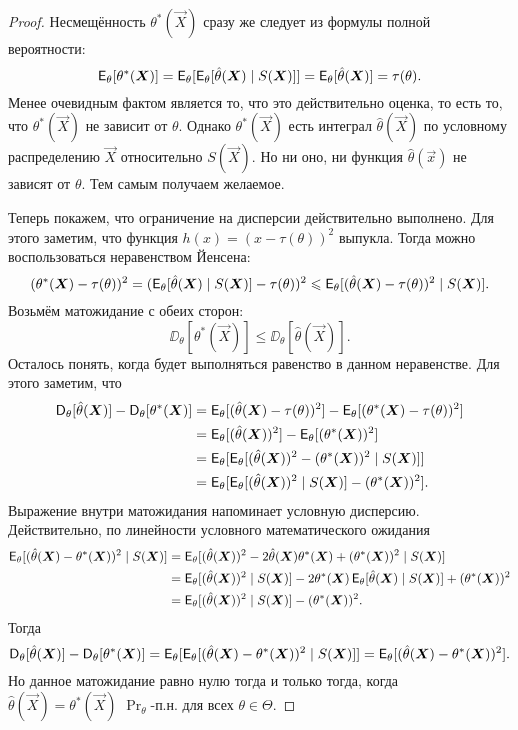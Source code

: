 \begin{proof}
	Несмещённость $\theta^{*}(\vec{X})$ сразу же следует из формулы полной вероятности:
	\[
		\operatorname{\mathsf{E}}_{\theta}[\theta^{*}(\bm{X})]
		= \operatorname{\mathsf{E}}_{\theta}[\operatorname{\mathsf{E}}_{\theta}[\hat{\theta}(\bm{X}) \mid S(\bm{X})]]
		= \operatorname{\mathsf{E}}_{\theta}[\hat{\theta}(\bm{X})]
		= \tau(\theta).
	\]
	Менее очевидным фактом является то, что это действительно оценка, то есть то, что $\theta^{*}(\vec{X})$ не зависит от $\theta$. Однако $\theta^{*}(\vec{X})$ есть интеграл $\hat{\theta}(\vec{X})$ по условному распределению $\vec{X}$ относительно $S(\vec{X})$. Но ни оно, ни функция $\hat{\theta}(\vec{x})$ не зависят от $\theta$. Тем самым получаем желаемое.

	Теперь покажем, что ограничение на дисперсии действительно выполнено. Для этого заметим, что функция $h(x) = (x - \tau(\theta))^{2}$ выпукла. Тогда можно воспользоваться неравенством Йенсена:
	\[
		(\theta^{*}(\bm{X}) - \tau(\theta))^{2} 
		= (\operatorname{\mathsf{E}}_{\theta}[\hat{\theta}(\bm{X}) \mid S(\bm{X})] - \tau(\theta))^{2}
		\leqslant \operatorname{\mathsf{E}}_{\theta}[(\hat{\theta}(\bm{X}) - \tau(\theta))^{2} \mid S(\bm{X})]. 
	\]
	Возьмём матожидание с обеих сторон:
	\[
		\DD_{\theta}[\theta^{*}(\vec{X})] \leq \DD_{\theta}[\hat{\theta}(\vec{X})].
	\]
	Осталось понять, когда будет выполняться равенство в данном неравенстве. Для этого заметим, что
	\begin{align*}
		\operatorname{\mathsf{D}}_{\theta}[\hat{\theta}(\bm{X})] - \operatorname{\mathsf{D}}_{\theta}[\theta^{*}(\bm{X})]
		&= \operatorname{\mathsf{E}}_{\theta}[(\hat{\theta}(\bm{X}) - \tau(\theta))^{2}] - \operatorname{\mathsf{E}}_{\theta}[(\theta^{*}(\bm{X}) - \tau(\theta))^{2}] \\
		&= \operatorname{\mathsf{E}}_{\theta}[(\hat{\theta}(\bm{X}))^{2}] - \operatorname{\mathsf{E}}_{\theta}[(\theta^{*}(\bm{X}))^{2}] \\
		&= \operatorname{\mathsf{E}}_{\theta}[\operatorname{\mathsf{E}}_{\theta}[(\hat{\theta}(\bm{X}))^{2} - (\theta^{*}(\bm{X}))^{2} \mid S(\bm{X})]] \\
		&= \operatorname{\mathsf{E}}_{\theta}[\operatorname{\mathsf{E}}_{\theta}[(\hat{\theta}(\bm{X}))^{2} \mid S(\bm{X})] - (\theta^{*}(\bm{X}))^{2}].
	\end{align*}
	Выражение внутри матожидания напоминает условную дисперсию. Действительно, по линейности условного математического ожидания
	\begin{align*}
		\operatorname{\mathsf{E}}_{\theta}[(\hat{\theta}(\bm{X}) - \theta^{*}(\bm{X}))^{2} \mid S(\bm{X})] 
		&= \operatorname{\mathsf{E}}_{\theta}[(\hat{\theta}(\bm{X}))^{2} - 2\hat{\theta}(\bm{X})\theta^{*}(\bm{X}) + (\theta^{*}(\bm{X}))^{2} \mid S(\bm{X})] \\
		&= \operatorname{\mathsf{E}}_{\theta}[(\hat{\theta}(\bm{X}))^{2} \mid S(\bm{X})] - 2\theta^{*}(\bm{X})\operatorname{\mathsf{E}}_{\theta}[\hat{\theta}(\bm{X}) \mid S(\bm{X})] + (\theta^{*}(\bm{X}))^{2} \\
		&= \operatorname{\mathsf{E}}_{\theta}[(\hat{\theta}(\bm{X}))^{2} \mid S(\bm{X})] - (\theta^{*}(\bm{X}))^{2}.
	\end{align*}
	Тогда
	\[
		\operatorname{\mathsf{D}}_{\theta}[\hat{\theta}(\bm{X})] - \operatorname{\mathsf{D}}_{\theta}[\theta^{*}(\bm{X})]
		= \operatorname{\mathsf{E}}_{\theta}[\operatorname{\mathsf{E}}_{\theta}[(\hat{\theta}(\bm{X}) - \theta^{*}(\bm{X}))^{2} \mid S(\bm{X})]]
		= \operatorname{\mathsf{E}}_{\theta}[(\hat{\theta}(\bm{X}) - \theta^{*}(\bm{X}))^{2}].
	\]
	Но данное матожидание равно нулю тогда и только тогда, когда $\hat{\theta}(\vec{X}) = \theta^{*}(\vec{X})$ $\Pr_{\theta}$-п.н. для всех $\theta \in \Theta$.
\end{proof}


